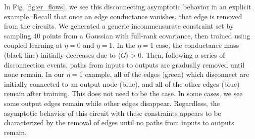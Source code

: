 \documentclass[final, 11pt, nonatbib]{elsarticle}
\theoremstyle{definition}
\theoremstyle{plain}
\numberwithin{equation}{section}
\begin{document}
In Fig~\ref{fig:er_flows}, we see this disconnecting asymptotic behavior in an explicit example. Recall that once an edge conductance vanishes, that edge is removed from the circuits. We generated a generic incommensurate constraint set by sampling 40 points from a Gaussian with full-rank covariance, then trained using coupled learning at $\eta=0$ and $\eta=1$. In the $\eta=1$ case, the conductance mass (black line) initially decreases due to $\langle G \rangle > 0$. Then, following a series of disconnection events, paths from inputs to outputs are gradually removed until none remain. In our $\eta=1$ example, all of the edges (green) which disconnect are initially connected to an output node (blue), and all of the other edges (blue) remain after training. This does not need to be the case. In some cases, we see some output edges remain while other edges disappear. Regardless, the asymptotic behavior of this circuit with these constraints appears to be characterized by the removal of edges until no paths from inputs to outputs remain. 
\end{document}
